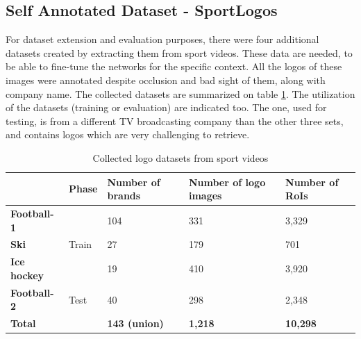 \subsection{Self Annotated Dataset - SportLogos}\label{ss:sportlogos}
For dataset extension and evaluation purposes, there were four additional datasets created by extracting them from sport videos. These data are needed, to be able to fine-tune the networks for the specific context. All the logos of these images were annotated despite occlusion and bad sight of them, along with company name. The collected datasets are summarized on table \ref{table:ownlogodatasets}. The utilization of the datasets (training or evaluation) are indicated too. The one, used for testing, is from a different TV broadcasting company than the other three sets, and contains logos which are very challenging to retrieve.
\bigbreak
\begin{table}[ht!]
\centering
\begin{tabular}{|l|l|l|l|l|}
\hline & \textbf{Phase} & \textbf{Number of brands} & \textbf{Number of logo images} & \textbf{Number of RoIs} \\
\hline
\multicolumn{1}{|l|}{\textbf{Football-1}} & \multirow{3}{*}{Train} & \multicolumn{1}{l|}{104} & \multicolumn{1}{l|}{331} & \multicolumn{1}{l|}{3,329} \\\cline{1-1}\cline{3-5}
\multicolumn{1}{|l|}{\textbf{Ski}} & & \multicolumn{1}{l|}{27} & \multicolumn{1}{l|}{179} & \multicolumn{1}{l|}{701} \\\cline{1-1}\cline{3-5}
\multicolumn{1}{|l|}{\textbf{Ice hockey}} & & \multicolumn{1}{l|}{19} & \multicolumn{1}{l|}{410} & \multicolumn{1}{l|}{3,920} \\\hline
\textbf{Football-2} & Test & 40 & 298 & 2,348 \\
\hline\hline
\multicolumn{2}{|l|}{\textbf{Total}} & \textbf{143 (union)} & \textbf{1,218} & \textbf{10,298} \\ \hline
\end{tabular}
\caption{Collected logo datasets from sport videos}
\label{table:ownlogodatasets}
\end{table}
\bigbreak

